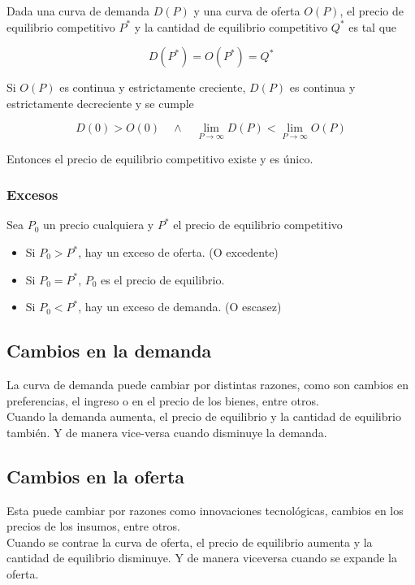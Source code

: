 Dada una curva de demanda $D(P)$ y una curva de oferta $O(P)$, el precio de equilibrio competitivo $P^*$ y la cantidad de equilibrio competitivo $Q^*$ es tal que

\[D(P^*) = O(P^*) = Q^*\]

Si $O(P)$ es continua y estrictamente creciente, $D(P)$ es continua y estrictamente decreciente y se cumple

\[D(0) > O(0) \quad \land \quad \lim_{P \to \infty}D(P) < \lim_{P \to \infty} O(P)\]

Entonces el precio de equilibrio competitivo existe y es único.

\subsubsection{Excesos}

Sea $P_0$ un precio cualquiera y $P^*$ el precio de equilibrio competitivo

\begin{itemize}
    \item Si $P_0 > P^*$, hay un exceso de oferta. (O excedente)
    \item Si $P_0 = P^*$, $P_0$ es el precio de equilibrio.
    \item Si $P_0 < P^*$, hay un exceso de demanda. (O escasez)
\end{itemize}

\subsection{Cambios en la demanda}

La curva de demanda puede cambiar por distintas razones, como son cambios en preferencias, el ingreso o en el precio de los bienes, entre otros.\\

Cuando la demanda aumenta, el precio de equilibrio y la cantidad de equilibrio también. Y de manera vice-versa cuando disminuye la demanda.

\subsection{Cambios en la oferta}

Esta puede cambiar por razones como innovaciones tecnológicas, cambios en los precios de los insumos, entre otros.\\

Cuando se contrae la curva de oferta, el precio de equilibrio aumenta y la cantidad de equilibrio disminuye. Y de manera viceversa cuando se expande la oferta.

